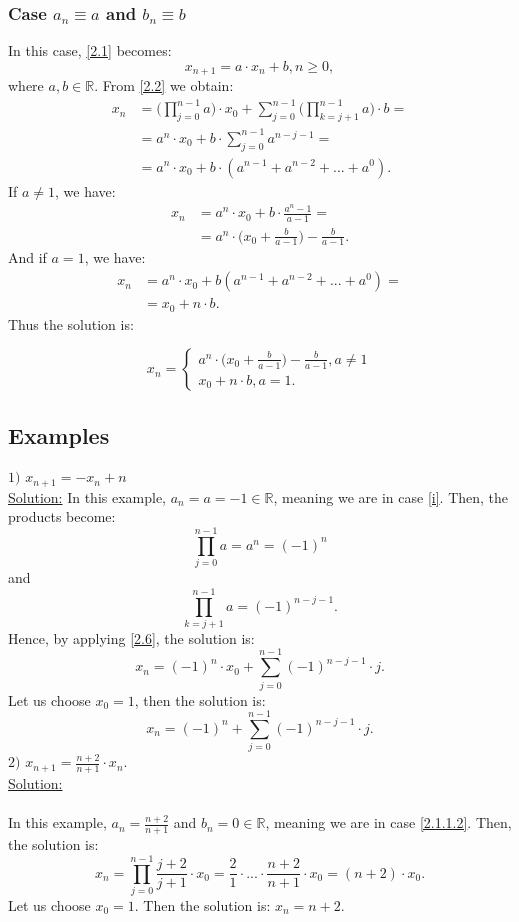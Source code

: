 \documentclass[a4paper,11pt]{report}
\newcommand{\R}{\mathbb{R}}
\begin{document}
\subsubsection{Case $a_{n}\equiv a$ and $b_{n}\equiv b$}
In this case, \eqref{2.1} becomes:
\begin{equation}
 x_{n+1}=a\cdot x_{n}+b, n\geq 0,
\end{equation}
where $a,b\in \R$.
From \eqref{2.2} we obtain:
\begin{align*}
 x_{n} &= \bigg(\prod_{j=0}^{n-1} a \bigg)\cdot x_{0}+\sum_{j=0}^{n-1}\bigg(\prod_{k=j+1}^{n-1}a\bigg)\cdot b=\\
 &=a^{n}\cdot x_{0}+b\cdot \sum_{j=0}^{n-1} a^{n-j-1}=\\
 &=a^{n}\cdot x_{0}+b\cdot (a^{n-1}+a^{n-2}+...+a^{0}).
\end{align*}
If $a \neq 1$, we have:
\begin{align*}
 x_{n}&=a^{n}\cdot x_{0}+b\cdot \frac{a^{n}-1}{a-1}=\\
 &= a^{n}\cdot \bigg(x_{0}+\frac{b}{a-1}\bigg)-\frac{b}{a-1}.
\end{align*}
And if $a=1$, we have:
\begin{align*}
 x_{n}&=a^{n}\cdot x_{0}+b(a^{n-1}+a^{n-2}+...+a^{0})=\\
 &=x_{0}+n\cdot b.
\end{align*}
Thus the solution is:

 $$x_{n}=\begin{cases}
        a^{n}\cdot \big(x_{0}+\frac{b}{a-1}\big)-\frac{b}{a-1}, a\neq 1 \\
        x_{0}+n\cdot b, a=1.
       \end{cases}
$$

\subsection{Examples}
$1)$ $x_{n+1}=-x_{n}+n$\\
\underline{Solution:}
In this example, $a_{n}=a=-1\in\R$, meaning we are in case \ref{i}. Then, the products become:
$$ \prod_{j=0}^{n-1} a=a^{n}=(-1)^{n}$$
and 
$$\prod_{k=j+1}^{n-1} a=(-1)^{n-j-1}.$$ 
Hence, by applying \eqref{2.6}, the solution is:
$$x_{n}=(-1)^{n}\cdot x_{0}+\sum_{j=0}^{n-1} (-1)^{n-j-1}\cdot j.$$
Let us choose $x_{0}=1$, then the solution is: $$x_{n}=(-1)^{n}+\sum_{j=0}^{n-1} (-1)^{n-j-1}\cdot j.$$
$2)$ $x_{n+1}=\frac{n+2}{n+1}\cdot x_{n}$.\\
\underline{Solution:}\\ \\
In this example, $a_{n}=\frac{n+2}{n+1}$ and $b_{n}=0 \in \R$, meaning we are in case \ref{2.1.1.2}. Then, the solution is:
$$ x_{n}=\prod_{j=0}^{n-1} \frac{j+2}{j+1}\cdot x_{0}=\frac{2}{1}\cdot ...\cdot \frac{n+2}{n+1} \cdot x_{0} =(n+2)\cdot x_{0}.$$
Let us choose $x_{0}=1$. Then the solution is: $x_{n}=n+2$.
\end{document}
